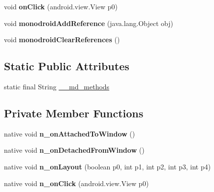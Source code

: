 \begin{DoxyCompactItemize}
void {\bfseries on\+Click} (android.\+view.\+View p0)
\item 
\mbox{\label{classmd5270abb39e60627f0f200893b490a1ade_1_1NavigationPageRenderer_a876162ea80dae791f8a70b5bc12ee81c}} 
void {\bfseries monodroid\+Add\+Reference} (java.\+lang.\+Object obj)
\item 
\mbox{\label{classmd5270abb39e60627f0f200893b490a1ade_1_1NavigationPageRenderer_a61d42127ac3ca068adc349d6a33af47a}} 
void {\bfseries monodroid\+Clear\+References} ()
\end{DoxyCompactItemize}
\subsection*{Static Public Attributes}
\begin{DoxyCompactItemize}
\item 
static final String \hyperlink{classmd5270abb39e60627f0f200893b490a1ade_1_1NavigationPageRenderer_af9b71b148669bb50bafafc240c856788}{\+\_\+\+\_\+md\+\_\+methods}
\end{DoxyCompactItemize}
\subsection*{Private Member Functions}
\begin{DoxyCompactItemize}
\item 
\mbox{\label{classmd5270abb39e60627f0f200893b490a1ade_1_1NavigationPageRenderer_aafa96226c385d53d071a1041caa0083b}} 
native void {\bfseries n\+\_\+on\+Attached\+To\+Window} ()
\item 
\mbox{\label{classmd5270abb39e60627f0f200893b490a1ade_1_1NavigationPageRenderer_a7059010250798b73240f397f59f241e0}} 
native void {\bfseries n\+\_\+on\+Detached\+From\+Window} ()
\item 
\mbox{\label{classmd5270abb39e60627f0f200893b490a1ade_1_1NavigationPageRenderer_acf8eee3954579f5da6d0ced3acc03357}} 
native void {\bfseries n\+\_\+on\+Layout} (boolean p0, int p1, int p2, int p3, int p4)
\item 
\mbox{\label{classmd5270abb39e60627f0f200893b490a1ade_1_1NavigationPageRenderer_a60a09228ae4643f98bcda0723fb33099}} 
native void {\bfseries n\+\_\+on\+Click} (android.\+view.\+View p0)
\end{DoxyCompactItemize}
